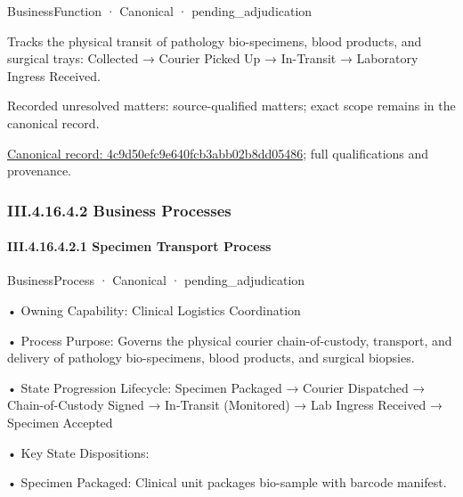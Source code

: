 \label{element:4c9d50efc9e640fcb3abb02b8dd05486}
{\small BusinessFunction · Canonical · pending\_adjudication}\par

Tracks the physical transit of pathology bio-specimens, blood products, and surgical trays: Collected → Courier Picked Up → In-Transit → Laboratory Ingress Received.


{\small Recorded unresolved matters: source-qualified matters; exact scope remains in the canonical record.}\par
{\footnotesize \href{../../../../continuum/business/business-function/4c9d50efc9e640fcb3abb02b8dd05486.md}{Canonical record: 4c9d50efc9e640fcb3abb02b8dd05486}; full qualifications and provenance.}\par
\subsubsection*{III.4.16.4.2 Business Processes}
\label{navigation:III.4.16.4.2}

\paragraph*{III.4.16.4.2.1 Specimen Transport Process}
\label{navigation:III.4.16.4.2.1}

\label{element:11bb000294fc44a8af295f4682e2fe6c}
{\small BusinessProcess · Canonical · pending\_adjudication}\par

•
Owning Capability: Clinical Logistics Coordination



•
Process Purpose: Governs the physical courier chain-of-custody, transport, and delivery of pathology bio-specimens, blood products, and surgical biopsies.



•
State Progression Lifecycle: Specimen Packaged → Courier Dispatched → Chain-of-Custody Signed → In-Transit (Monitored) → Lab Ingress Received → Specimen Accepted



•
Key State Dispositions:



•
Specimen Packaged: Clinical unit packages bio-sample with barcode manifest.



